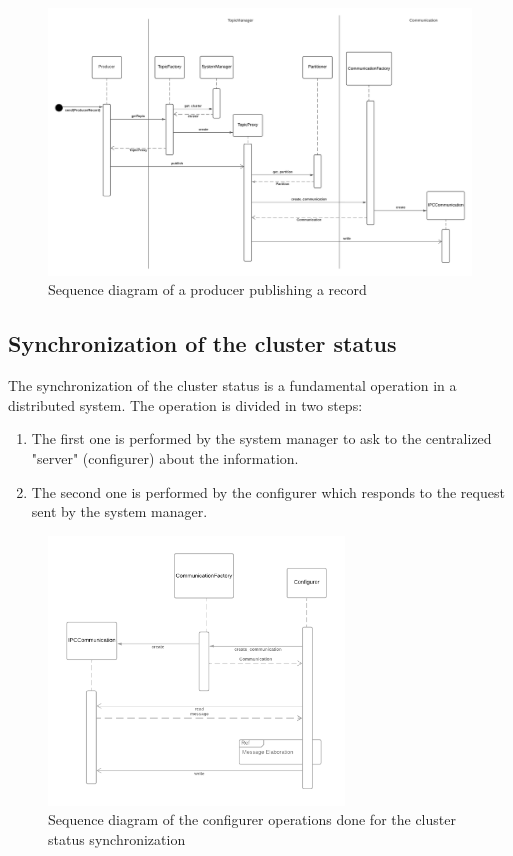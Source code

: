 \begin{figure}[ht]
    \centering
    \includegraphics[width=1.0\textwidth]{Figures/sequence_diagram_producer.png}
    \caption{Sequence diagram of a producer publishing a record}
\end{figure}

\subsection{Synchronization of the cluster status}

The synchronization of the cluster status is a fundamental operation in a
distributed system.
The operation is divided in two steps:

\begin{enumerate}
    \item   The first one is performed by the system manager to ask to the
            centralized "server" (configurer) about the information. 
    \item   The second one is performed by the configurer which responds to
            the request sent by the system manager.
\end{enumerate}

\begin{figure}[H]
    \centering
    \includegraphics[width=0.7\textwidth]{Figures/sequence_diagram_cluster_status_configurer.png}
    \caption{Sequence diagram of the configurer operations done for the cluster
             status synchronization}
\end{figure}


